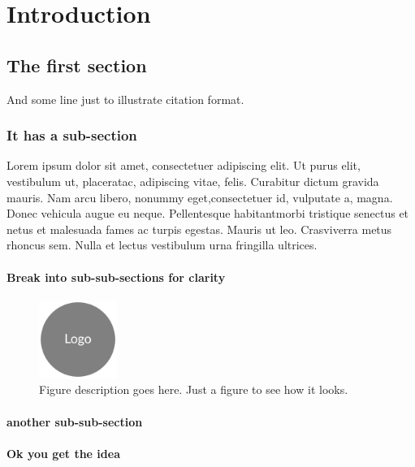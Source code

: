 \documentclass[a4paper, oneside, 11pt]{book}
\begin{document}
\chapter{Introduction}
\label{ch:intro}

\section{The first section}
\label{sec:firstone}
\lipsum[1] And some line just to illustrate citation \supercite{example} format.

  \subsection{It has a sub-section}

  Lorem ipsum dolor sit amet, consectetuer adipiscing elit. Ut purus elit, vestibulum ut, placeratac, adipiscing vitae, felis. Curabitur dictum gravida mauris. Nam arcu libero, nonummy eget,consectetuer id, vulputate a, magna. Donec vehicula augue eu neque. Pellentesque habitantmorbi tristique senectus et netus et malesuada fames ac turpis egestas. Mauris ut leo. Crasviverra metus rhoncus sem. Nulla et lectus vestibulum urna fringilla ultrices.

      \subsubsection{Break into sub-sub-sections for clarity}
      \lipsum[1]
			\begin{figure}
			  \centering
				\includegraphics[width=1in, keepaspectratio]{logo.png}
				\caption[Appears in figure list]{\small Figure description goes here. Just a figure to see how it looks.}
			\end{figure}

      \subsubsection{another sub-sub-section}
      \lipsum[1-2]

      \subsubsection{Ok you get the idea}
      \lipsum[1]
\end{document}

